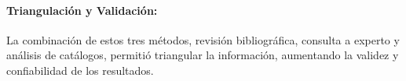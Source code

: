 \documentclass[runningheads]{llncs}
\begin{document}
\paragraph{Triangulación y Validación:}
 La combinación de estos tres métodos, revisión bibliográfica, consulta a experto y análisis de catálogos, permitió triangular la información, aumentando la validez y confiabilidad de los resultados.





\end{document}
